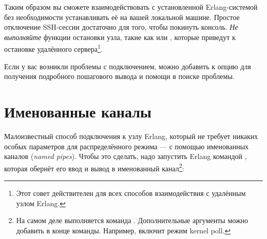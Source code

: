 \documentclass[11pt, oneside]{book}   	%
\begin{document}
Таким образом вы сможете взаимодействовать с установленной Erlang-системой без необходимости устанавливать её на вашей локальной машине. Простое отключение SSH-сессии достаточно для того, чтобы покинуть консоль. \emph{Не выполняйте} функции остановки узла, такие как  или , которые приведут к остановке удалённого сервера\footnote{Этот совет действителен для всех способов взаимодействия с удалённым узлом Erlang.}.

Если у вас возникли проблемы с подключением, можно добавить к  опцию  для получения подробного пошагового вывода и помощи в поиске проблемы.


\section{Именованные каналы}

Малоизвестный способ подключения к узлу Erlang, который не требует никаких особых параметров для распределённого режима --- с помощью именованных каналов (\emph{named pipes}). Чтобы это сделать, надо запустить Erlang командой , которая обернёт его ввод и вывод в именованный канал\footnote{На самом деле выполняется команда . Дополнительные аргументы можно добавить в конце команды. Например,  включит режим kernel poll.}:

\end{document}

